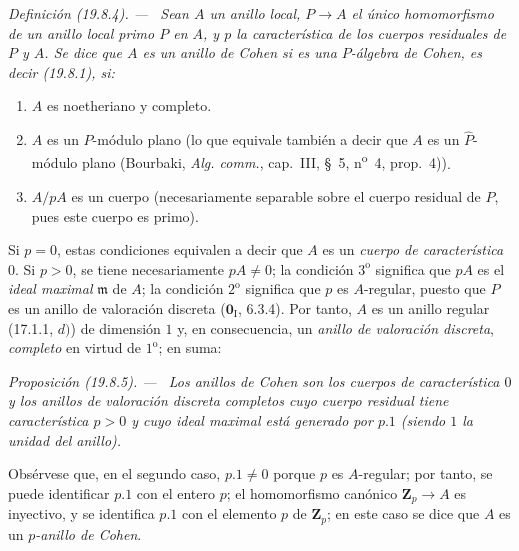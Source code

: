 \documentclass[10pt,oneside]{book}
\makeatletter
\newcommand{\setmanualcurrentlabel}[1]{\def\@currentlabel{#1}}
\newcommand{\oldpage}[2][]{%
  \setcounter{footnote}{0}%
  \marginpar{\scriptsize\textbf{#1}~|~#2}\ignorespaces}
\newenvironment{definition}[1][]{%
  \setmanualcurrentlabel{#1}\par\medskip\noindent\itshape Definición (#1). ---\ }{\par}
\newenvironment{proposition}[1][]{%
  \setmanualcurrentlabel{#1}\par\medskip\noindent\itshape Proposición (#1). ---\ }{\par}
\makeatother
\begin{document}
\oldpage[0\textsubscript{IV-1}]{111}

\begin{definition}[19.8.4]
\label{0.19.8.4-es}
Sean $A$ un anillo local, $P\to A$ el único homomorfismo de un anillo local
primo $P$ en $A$, y $p$ la característica de los cuerpos residuales de $P$ y
$A$. Se dice que $A$ es un \emph{anillo de Cohen} si es una $P$-álgebra de
Cohen, es decir \textup{(19.8.1)}, si:
\begin{enumerate}
  \item[$1^{\mathrm o}$] $A$ es noetheriano y completo.
  \item[$2^{\mathrm o}$] $A$ es un $P$-módulo plano \textup{(lo que equivale también a
  decir que $A$ es un $\widehat P$-módulo plano (Bourbaki, \emph{Alg. comm.},
  cap.~III, §~5, n\textsuperscript{o}~4, prop.~4))}.
  \item[$3^{\mathrm o}$] $A/pA$ es un cuerpo \textup{(necesariamente separable sobre el
  cuerpo residual de $P$, pues este cuerpo es primo)}.
\end{enumerate}
\end{definition}

Si $p=0$, estas condiciones equivalen a decir que $A$ es un \emph{cuerpo de
característica $0$}. Si $p>0$, se tiene necesariamente $pA\neq0$; la condición
$3^{\mathrm o}$ significa que $pA$ es el \emph{ideal maximal} $\mathfrak m$ de $A$;
la condición $2^{\mathrm o}$ significa que $p$ es $A$-regular, puesto que $P$
es un anillo de valoración discreta ($\mathbf 0_{\mathrm I}$, 6.3.4). Por tanto,
$A$ es un anillo regular (17.1.1, $d)$) de dimensión $1$ y, en consecuencia, un
\emph{anillo de valoración discreta}, \emph{completo} en virtud de $1^{\mathrm o}$; en suma:

\begin{proposition}[19.8.5]
\label{0.19.8.5-es}
Los anillos de Cohen son los cuerpos de característica $0$ y los anillos de
valoración discreta completos cuyo cuerpo residual tiene característica
$p>0$ y cuyo ideal maximal está generado por $p.1$ (siendo $1$ la unidad del
anillo).
\end{proposition}

Obsérvese que, en el segundo caso, $p.1\neq0$ porque $p$ es $A$-regular;
por tanto, se puede identificar $p.1$ con el entero $p$; el homomorfismo
canónico $\mathbf Z_p\to A$ es inyectivo, y se identifica $p.1$ con el
elemento $p$ de $\mathbf Z_p$; en este caso se dice que $A$ es un
\emph{$p$-anillo de Cohen}.
\end{document}

